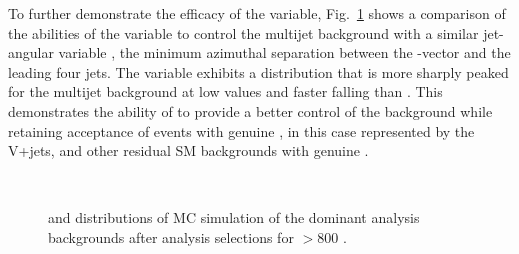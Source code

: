 To further demonstrate the efficacy of the \bdphi variable,
Fig.~\ref{fig:bDPhi_nominal} shows a comparison of the abilities of
the \bdphi variable to control the \QCD multijet background with a
similar jet-\mht angular variable \dphimhtj, the minimum azimuthal
separation between the \mht-vector and the leading four jets. The
\bdphi variable exhibits a distribution that is more sharply peaked
for the \QCD multijet background at low values and faster falling than
\dphimhtj. This
demonstrates the ability of \bdphi to provide a better control of the
\QCD background while retaining acceptance of events with genuine
\mht, in this case represented by the V+jets, \ttbar and other
residual SM backgrounds with genuine \met. 

\begin{figure}[!h]
 \centering
  \\
 \caption{\bdphi and \dphimhtj distributions of MC simulation of the
 dominant analysis backgrounds
 after analysis selections for \scalht $> 800$ \GeV. }
 \label{fig:bDPhi_nominal}
\end{figure}

